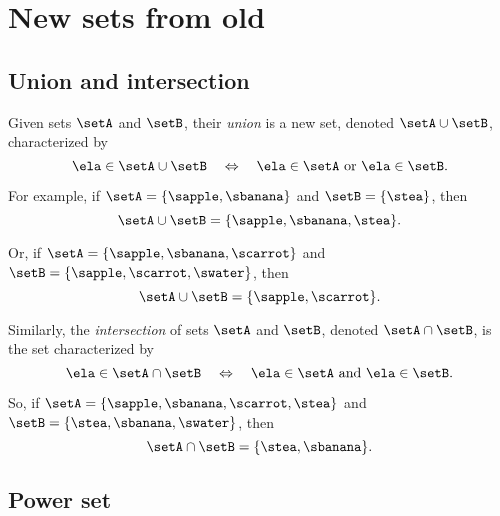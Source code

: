 
\section{New sets from old}



\subsection{Union and intersection}

Given sets $\setA$ and $\setB$, their \emph{union} is a new set, denoted $\setA \cup \setB$, characterized by 
\begin{equation*}
\ela \in \setA \cup \setB \quad \Leftrightarrow \quad \ela \in \setA \ \text{or} \ \ela \in \setB. 
\end{equation*}

For example, if $\setA = \{ \sapple, \sbanana \}$ and $\setB = \{ \stea \}$, then 
\begin{equation*}
\setA \cup \setB = \{ \sapple, \sbanana, \stea \}. 
\end{equation*}

Or, if $\setA = \{ \sapple, \sbanana, \scarrot \}$ and $\setB = \{ \sapple, \scarrot, \swater \}$, then
\begin{equation*}
\setA \cup \setB = \{ \sapple, \scarrot \}. 
\end{equation*}

Similarly, the \emph{intersection} of sets $\setA$ and $\setB$, denoted $\setA \cap \setB$, is the set characterized by 
\begin{equation*}
\ela \in \setA \cap \setB \quad \Leftrightarrow \quad \ela \in \setA \ \text{and} \ \ela \in \setB. 
\end{equation*}

So, if $\setA = \{ \sapple, \sbanana, \scarrot, \stea \}$ and $\setB = \{ \stea, \sbanana, \swater \}$, then
\begin{equation*}
\setA \cap \setB = \{ \stea, \sbanana \}. 
\end{equation*}



\subsection{Power set}
\label{sec:power-set}

